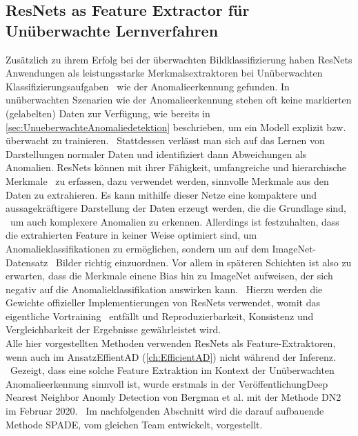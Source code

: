 \subsection{ResNets as Feature Extractor für Unüberwachte Lernverfahren}\label{subsec:ResNetsAsFeatureExtractor}
Zusätzlich zu ihrem Erfolg bei der überwachten Bildklassifizierung haben ResNets Anwendungen als leistungsstarke Merkmalsextraktoren bei Unüberwachten Klassifizierungsaufgaben \ 
wie der Anomalieerkennung gefunden. In unüberwachten Szenarien wie der Anomalieerkennung stehen oft keine markierten (gelabelten) Daten zur Verfügung, wie bereits in \ref{sec:UnueberwachteAnomaliedetektion} beschrieben, um ein Modell explizit bzw. überwacht zu trainieren. \ 
Stattdessen verlässt man sich auf das Lernen von Darstellungen normaler Daten und identifiziert dann Abweichungen als Anomalien. ResNets können mit ihrer Fähigkeit, umfangreiche und hierarchische Merkmale \ 
zu erfassen, dazu verwendet werden, sinnvolle Merkmale aus den Daten zu extrahieren. Es kann mithilfe dieser Netze eine kompaktere und aussagekräftigere Darstellung der Daten erzeugt werden, die die Grundlage sind, \
um auch komplexere Anomalien zu erkennen. Allerdings ist festzuhalten, dass die extrahierten Feature in keiner Weise optimiert sind, um Anomalieklassifikationen zu ermöglichen, sondern um auf dem ImageNet-Datensatz \
Bilder richtig einzuordnen. Vor allem in späteren Schichten ist also zu erwarten, dass die Merkmale einene \glqq Bias \grqq{} hin zu ImageNet aufweisen, der sich negativ auf die Anomalieklassifikation auswirken kann.\cite{patchcore} \ 
Hierzu werden die Gewichte offizieller Implementierungen von ResNets verwendet, womit das eigentliche Vortraining \ 
entfällt und Reproduzierbarkeit, Konsistenz und Vergleichbarkeit der Ergebnisse gewährleistet wird. \\
Alle hier vorgestellten Methoden verwenden ResNets als Feature-Extraktoren, wenn auch im Ansatz\glqq EffientAD\grqq{} (\ref{ch:EfficientAD}) nicht während der Inferenz. \
Gezeigt, dass eine solche Feature Extraktion im Kontext der Unüberwachten Anomalieerkennung sinnvoll ist, wurde erstmals in der Veröffentlichung\glqq Deep Nearest Neighbor Anomly Detection\grqq{} von Bergman et al.\cite{DN2} mit der Methode \glqq DN2\grqq{} im Februar 2020. \
Im nachfolgenden Abschnitt wird die darauf aufbauende Methode \glqq SPADE\grqq{}, vom gleichen Team entwickelt, vorgestellt. \
